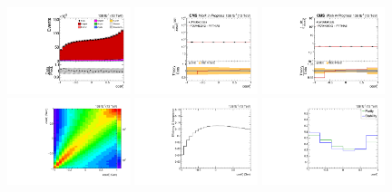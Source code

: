 \begin{figure}[htb]
\begin{center}
 \includegraphics[width=0.32\textwidth]{fig_fullRun2UL/controlplots/combined/Hyp_AntiLeptonBk.pdf}
 \includegraphics[width=0.32\textwidth]{fig_fullRun2UL/unfolding/combined/UnfoldedResults_b1k.pdf}
 \includegraphics[width=0.32\textwidth]{fig_fullRun2UL/unfolding/combined/UnfoldedResultsNorm_b1k.pdf} \\
 \includegraphics[width=0.32\textwidth]{fig_fullRun2UL/unfolding/combined/ResponseMatrix_b1k.pdf}
 \includegraphics[width=0.32\textwidth]{fig_fullRun2UL/unfolding/combined/TotEff_b1k.pdf}
 \includegraphics[width=0.32\textwidth]{fig_fullRun2UL/unfolding/combined/PurStab_b1k.pdf} \\

\end{center}
\end{figure}
